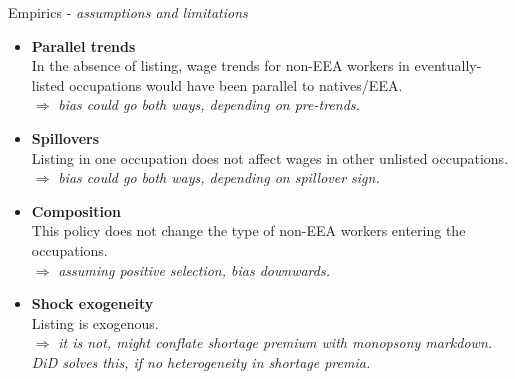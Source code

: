 \documentclass[aspectratio=169,10pt,xcolor={dvipsnames}]{beamer}
\begin{document}
\begin{frame}{Empirics - \textit{assumptions and limitations}}
    \begin{itemize}

    \item \alert{\textbf{Parallel trends}} \\
		In the absence of listing, wage trends for non-EEA workers in eventually-listed occupations would have been parallel to natives/EEA. \\
		$\Rightarrow$ \textit{bias could go both ways, depending on pre-trends.}
		\vspace{0.1cm}
	
	\item \alert{\textbf{Spillovers}} \\
		Listing in one occupation does not affect wages in other unlisted occupations. \\
		$\Rightarrow$ \textit{bias could go both ways, depending on spillover sign.}
		\vspace{0.1cm}

	\item \alert{\textbf{Composition}} \\
		This policy does not change the type of non-EEA workers entering the occupations. \\
		$\Rightarrow$ \textit{assuming positive selection, bias downwards.}
		\vspace{0.1cm}

	\item \alert{\textbf{Shock exogeneity}} \\
		Listing is exogenous.  \\
		$\Rightarrow$ \textit{it is not, might conflate shortage premium with monopsony markdown. DiD solves this, if no heterogeneity in shortage premia.}
		\vspace{0.1cm}
    \end{itemize}

\end{frame}
\end{document}
